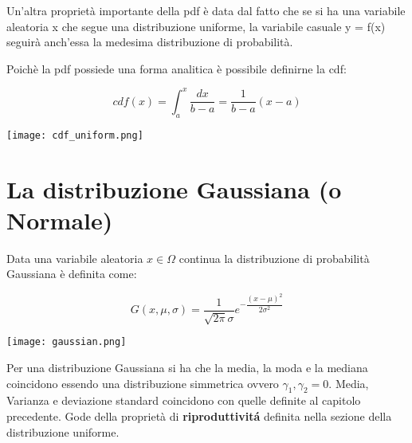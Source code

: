 \documentclass[11pt,a4paper]{book}
\begin{document}
Un'altra propriet\`{a} importante della pdf \`{e} data dal fatto che se si ha una variabile aleatoria x che segue una distribuzione uniforme, la variabile casuale y = f(x) seguir\`{a} anch'essa la medesima distribuzione di probabilit\`{a}.\newline

\noindent Poich\`{e} la pdf possiede una forma analitica \`{e} possibile definirne la cdf:



\vspace{0.3in}

  \begin{minipage}{0.5\textwidth}
  	\begin{equation*}
	cdf(x) = \int_{a}^{x}\dfrac{dx}{b-a} = \dfrac{1}{b-a}(x-a)
\end{equation*}
  \end{minipage}
  \begin{minipage}{.4\textwidth}
    \centering
    \texttt{[image: cdf\_uniform.png]}

  \end{minipage}
\vspace{0.3in}

\section{La distribuzione Gaussiana (o Normale)}

Data una variabile aleatoria $x \in \Omega $ continua la distribuzione di probabilit\`{a} Gaussiana \`{e} definita come:

\vspace{0.3in}

  \begin{minipage}{0.5\textwidth}
\begin{equation}
	G(x,\mu,\sigma) = \dfrac{1}{\sqrt{2\pi}\sigma} e^{-\dfrac{(x-\mu)^2}{2\sigma^2}}
\end{equation}
  \end{minipage}
  \begin{minipage}{.4\textwidth}
    \centering
    \texttt{[image: gaussian.png]}

  \end{minipage}
\vspace{0.3in}

Per una distribuzione Gaussiana si ha che la media, la moda e la mediana coincidono essendo una distribuzione simmetrica ovvero $\gamma_{1},\gamma_2 = 0$. Media, Varianza e deviazione standard coincidono con quelle definite al capitolo precedente. Gode della propriet\`{a} di \textbf{riproduttivit\'{a}} definita nella sezione della distribuzione uniforme.\newline
\end{document}
